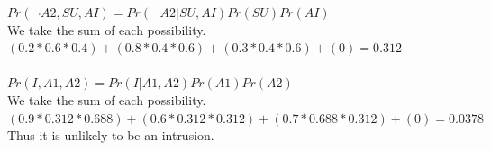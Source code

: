 \documentclass{article}
\begin{document}
$Pr(\neg A2,SU,AI) = Pr(\neg A2|SU,AI)Pr(SU)Pr(AI)$\\
We take the sum of each possibility.\\
$(0.2 * 0.6 * 0.4) + (0.8 * 0.4 * 0.6) + (0.3 * 0.4 * 0.6) + (0) = 0.312$\\\\

$Pr(I,A1,A2) = Pr(I|A1,A2)Pr(A1)Pr(A2)$\\
We take the sum of each possibility.\\
$(0.9 * 0.312 * 0.688) + (0.6 * 0.312 * 0.312) + (0.7 * 0.688 * 0.312) + (0) = 0.0378$\\
Thus it is unlikely to be an intrusion.
\end{document}
